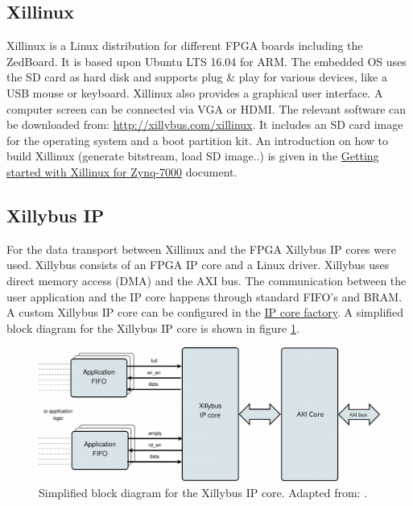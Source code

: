 \documentclass[
			fontsize = 12pt,
			paper = a4
			]
			{scrartcl}%
\newcommand{\?}{\ensuremath{^\texttt{\textbf [CITATION~NEEDED]}}}
\begin{document}
\subsection{Xillinux}
\label{sec:xillinux}
Xillinux is a Linux distribution for different FPGA boards including the ZedBoard. It is based upon Ubuntu LTS 16.04 for ARM. The embedded OS uses the SD card as hard disk and supports plug \& play for various devices, like a USB mouse or keyboard. Xillinux also provides a graphical user interface. A computer screen can be connected via VGA or HDMI. The relevant software can be downloaded from: \hyperlink{http://xillybus.com/xillinux}{http://xillybus.com/xillinux}. It includes an SD card image for the operating system and a boot partition kit. An introduction on how to build Xillinux (generate bitstream, load SD image..) is given in the \hyperlink{http://xillybus.com/downloads/doc/xillybus_getting_started_zynq.pdf}{Getting started with Xillinux for Zynq-7000} document.

\newpage

\subsection{Xillybus IP}
\label{sec:xilibusip}
For the data transport between Xillinux and the FPGA Xillybus IP cores were used. Xillybus consists of an FPGA IP core and a Linux driver. Xillybus uses direct memory access (DMA) and the AXI bus. The communication between the user application and the IP core happens through standard FIFO's and BRAM. A custom Xillybus IP core can be configured in the \hyperlink{http://xillybus.com/ipfactory/}{IP core factory}. A simplified block diagram for the Xillybus IP core is shown in figure \ref{fig:xillibus}.

\begin{figure}[H]
    \centering
    \includegraphics[width=\textwidth]{fig/xillybus.png}
    \caption{Simplified block diagram for the Xillybus IP core. Adapted from: \cite{xillibus}.}
    \label{fig:xillibus}
\end{figure}
\end{document}
